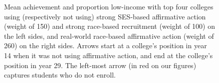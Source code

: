 \begin{figure}[p]
  \centering
  \hfill%
  \caption{Mean achievement and proportion low-income with top four colleges using (respectively not using) strong SES-based affirmative action (weight of 150) and strong race-based recruitment (weight of 100) on the left sides, and real-world race-based affirmative action (weight of 260) on the right sides.
  Arrows start at a college's position in year 14 when it was not using affirmative action, and end at the college's position in year 29.
  The left-most arrow (in red on our figures) captures students who do not enroll.}
  \label{fig:3a}
\end{figure}

